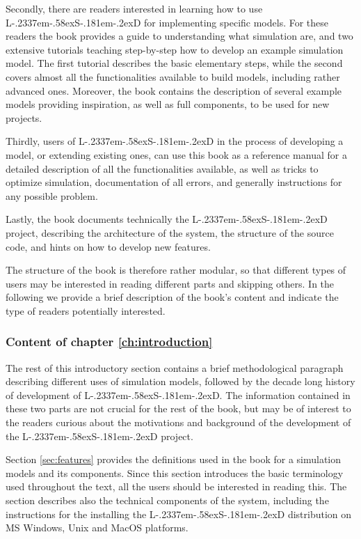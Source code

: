 \documentclass [11pt,a4paper] {book}
\def\LsD{{L\kern-.2337em\lower-.58ex\hbox{S}\kern-.181em\lower-.2ex\hbox{D}}\xspace}
\begin{document}
Secondly, there are readers interested in learning how to use \LsD for implementing specific models. For these readers the book provides a guide to understanding what simulation are, and two extensive tutorials teaching step-by-step how to develop an example simulation model. The first tutorial describes the basic elementary steps, while the second covers almost all the functionalities available to build models, including rather advanced ones. Moreover, the book contains the description of several example models providing inspiration, as well as full components, to be used for new projects. 

Thirdly, users of \LsD in the process of developing a model, or extending existing ones, can use this book as a reference manual for a detailed description of all the functionalities available, as well as tricks to optimize simulation, documentation of all errors, and generally instructions for any possible problem. 

Lastly, the book documents technically the \LsD project, describing the architecture of the system, the structure of the source code, and hints on how to develop new features.

The structure of the book is therefore rather modular, so that different types of users may be interested in reading different parts and skipping others. In the following we provide a brief description of the book's content and indicate the type of readers potentially interested.

\subsubsection{Content of chapter \ref{ch:introduction}}
The rest of this introductory section contains a brief methodological paragraph describing different uses of simulation models, followed by the decade long history of development of \LsD. The information contained in these two parts are not crucial for the rest of the book, but may be of interest to the readers curious about the motivations and background of the development of the \LsD project.

Section \ref{sec:features} provides the definitions used in the book for a simulation models and its components. Since this section introduces the basic terminology used throughout the text, all the users should be interested in reading this. The section describes also the technical components of the system, including the instructions for the installing the \LsD distribution on MS Windows, Unix and MacOS platforms. 
\end{document}
